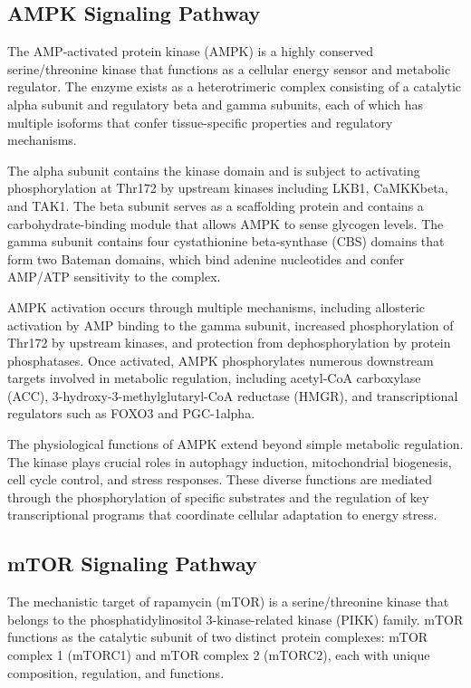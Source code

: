 \documentclass[11pt,a4paper]{article}
\begin{document}
\subsection{AMPK Signaling Pathway}

The AMP-activated protein kinase (AMPK) is a highly conserved serine/threonine kinase that functions as a cellular energy sensor and metabolic regulator. The enzyme exists as a heterotrimeric complex consisting of a catalytic alpha subunit and regulatory beta and gamma subunits, each of which has multiple isoforms that confer tissue-specific properties and regulatory mechanisms.

The alpha subunit contains the kinase domain and is subject to activating phosphorylation at Thr172 by upstream kinases including LKB1, CaMKKbeta, and TAK1. The beta subunit serves as a scaffolding protein and contains a carbohydrate-binding module that allows AMPK to sense glycogen levels. The gamma subunit contains four cystathionine beta-synthase (CBS) domains that form two Bateman domains, which bind adenine nucleotides and confer AMP/ATP sensitivity to the complex.

AMPK activation occurs through multiple mechanisms, including allosteric activation by AMP binding to the gamma subunit, increased phosphorylation of Thr172 by upstream kinases, and protection from dephosphorylation by protein phosphatases. Once activated, AMPK phosphorylates numerous downstream targets involved in metabolic regulation, including acetyl-CoA carboxylase (ACC), 3-hydroxy-3-methylglutaryl-CoA reductase (HMGR), and transcriptional regulators such as FOXO3 and PGC-1alpha.

The physiological functions of AMPK extend beyond simple metabolic regulation. The kinase plays crucial roles in autophagy induction, mitochondrial biogenesis, cell cycle control, and stress responses. These diverse functions are mediated through the phosphorylation of specific substrates and the regulation of key transcriptional programs that coordinate cellular adaptation to energy stress.

\subsection{mTOR Signaling Pathway}

The mechanistic target of rapamycin (mTOR) is a serine/threonine kinase that belongs to the phosphatidylinositol 3-kinase-related kinase (PIKK) family. mTOR functions as the catalytic subunit of two distinct protein complexes: mTOR complex 1 (mTORC1) and mTOR complex 2 (mTORC2), each with unique composition, regulation, and functions.
\end{document}
